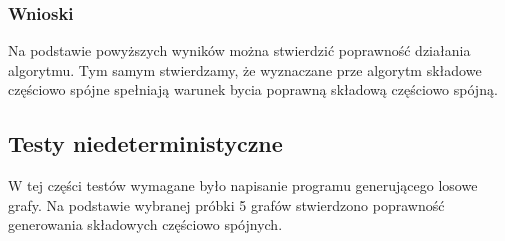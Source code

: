 \documentclass[a4paper,10pt]{article}
\begin{document}
\subsubsection{Wnioski}
Na podstawie powyższych wyników można stwierdzić poprawność działania algorytmu. Tym samym stwierdzamy, że wyznaczane prze algorytm składowe częściowo spójne spełniają warunek bycia poprawną składową częściowo spójną.

\subsection{Testy niedeterministyczne}

W tej części testów wymagane było napisanie programu generującego losowe grafy. Na podstawie wybranej próbki 5 grafów stwierdzono poprawność generowania składowych częściowo spójnych.\\
\end{document}
